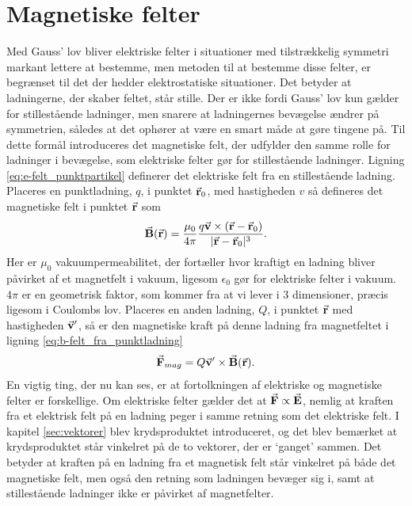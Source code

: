 \section{Magnetiske felter}
Med Gauss' lov bliver elektriske felter i situationer med tilstrækkelig symmetri markant lettere at bestemme, men metoden til at bestemme disse felter, er begrænset til det der hedder elektrostatiske situationer. Det betyder at ladningerne, der skaber feltet, står stille. Der er ikke fordi Gauss' lov kun gælder for stillestående ladninger, men snarere at ladningernes bevægelse ændrer på symmetrien, således at det ophører at være en smart måde at gøre tingene på. Til dette formål introduceres det magnetiske felt, der udfylder den samme rolle for ladninger i bevægelse, som elektriske felter gør for stillestående ladninger. Ligning \eqref{eq:e-felt_punktpartikel} definerer det elektriske felt fra en stillestående ladning. Placeres en punktladning, $q$, i punktet $\va r_0$, med hastigheden $v$ så defineres det magnetiske felt i punktet $\va r$ som
%
\begin{align} \label{eq:b-felt_fra_punktladning}
    \va B(\va r) = \frac{\mu_0}{4\pi}\frac{q\va v \times (\va r - \va r_0)}{|\va r - \va r_0|^3}.
\end{align}
%
Her er $\mu_0$ vakuumpermeabilitet, der fortæller hvor kraftigt en ladning bliver påvirket af et magnetfelt i vakuum, ligesom $\epsilon_0$ gør for elektriske felter i vakuum. $4\pi$ er en geometrisk faktor, som kommer fra at vi lever i 3 dimensioner, præcis ligesom i Coulombs lov. Placeres en anden ladning, $Q$, i punktet $\va r$ med hastigheden $\va v'$, så er den magnetiske kraft på denne ladning fra magnetfeltet i ligning \eqref{eq:b-felt_fra_punktladning}
%
\begin{align} \label{eq:magnetisk_kraft}
    \va F_{mag} = Q\va v' \times \va B(\va r).
\end{align}
%
En vigtig ting, der nu kan ses, er at fortolkningen af elektriske og magnetiske felter er forskellige. Om elektriske felter gælder det at $\va F \propto \va E$, nemlig at kraften fra et elektrisk felt på en ladning peger i samme retning som det elektriske felt. I kapitel \ref{sec:vektorer} blev krydsproduktet introduceret, og det blev bemærket at krydsproduktet står vinkelret på de to vektorer, der er `ganget' sammen. Det betyder at kraften på en ladning fra et magnetisk felt står vinkelret på både det magnetiske felt, men også den retning som ladningen bevæger sig i, samt at stillestående ladninger ikke er påvirket af magnetfelter.


